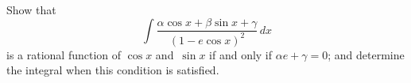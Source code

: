 Show that
\[
\int \frac{\alpha\cos x + \beta\sin x + \gamma}{(1 - e\cos x)^{2}}\, dx
\]
is a rational function of $\cos x$ and~$\sin x$ if and only if $\alpha e + \gamma = 0$; and determine
the integral when this condition is satisfied.

